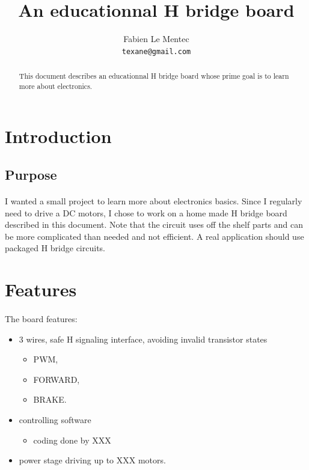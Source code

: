 \documentclass[12pt]{article}
\title{An educationnal H bridge board}
\author{Fabien Le Mentec\\
\small \texttt{texane@gmail.com}
}
\date{}
\begin{document}
\maketitle

\begin{abstract}
This document describes an educationnal H bridge board whose prime goal is to learn more about electronics.
\end{abstract}


\newpage
\section{Introduction}

\subsection{Purpose}
\paragraph{} I wanted a small project to learn more about electronics basics. Since I regularly need to
drive a DC motors, I chose to work on a home made H bridge board described in this document. Note that
the circuit uses off the shelf parts and can be more complicated than needed and not efficient. A real
application should use packaged H bridge circuits.


\newpage
\section{Features}
\paragraph{} The board features:
\begin{itemize}
  \item 3 wires, safe H signaling interface, avoiding invalid transistor states
    \begin{itemize}
      \item PWM,
      \item FORWARD,
      \item BRAKE.
    \end{itemize}
  \item controlling software
    \begin{itemize}
      \item coding done by XXX
    \end{itemize}
  \item power stage driving up to XXX motors.
\end{itemize}
\end{document}
